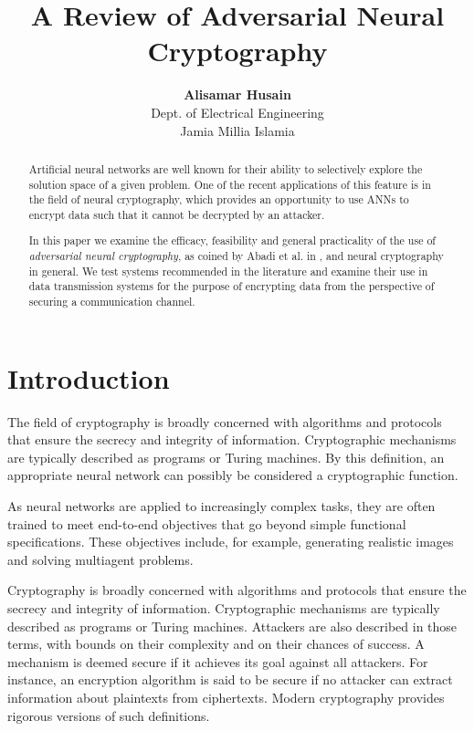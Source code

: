 \documentclass[a4paper]{article}
\date{}
\title{A Review of Adversarial Neural Cryptography}
\author{
  {\bf Alisamar Husain}\\
  Dept. of Electrical Engineering\\
  Jamia Millia Islamia
}
\begin{document}
  \maketitle

  \begin{abstract}
    Artificial neural networks are well known for their ability to selectively 
    explore the solution space of a given problem.
    One of the recent applications of this feature is in the field of neural 
    cryptography, which provides an opportunity to use ANNs to encrypt data 
    such that it cannot be decrypted by an attacker.

    In this paper we examine the efficacy, feasibility and 
    general practicality of the use of {\it adversarial neural cryptography}, 
    as coined by Abadi et al. in \cite{seminalanc}, and neural cryptography
    in general. We test systems recommended in the literature and examine their 
    use in data transmission systems for the purpose of encrypting data from
    the perspective of securing a communication channel.
  \end{abstract}
 
  \section{Introduction}
  The field of cryptography is broadly concerned with algorithms and protocols 
  that ensure the secrecy and integrity of information. Cryptographic mechanisms are 
  typically described as programs or Turing machines. By this definition, an
  appropriate neural network can possibly be considered a cryptographic function.

  As neural networks are applied to increasingly complex tasks, they are often trained to meet end-to-end 
  objectives that go beyond simple functional specifications. These objectives include, for
  example, generating realistic images\cite{gans} and solving multiagent problems. 

  Cryptography is broadly concerned with algorithms and protocols that ensure the secrecy and integrity
  of information. Cryptographic mechanisms are typically described as programs or Turing
  machines. Attackers are also described in those terms, with bounds on their complexity 
  and on their chances of success. A mechanism is deemed secure if it achieves its goal 
  against all attackers. For instance, an encryption algorithm is said to be secure if 
  no attacker can extract information about plaintexts from ciphertexts.
  Modern cryptography provides rigorous versions of such definitions.
\end{document}
